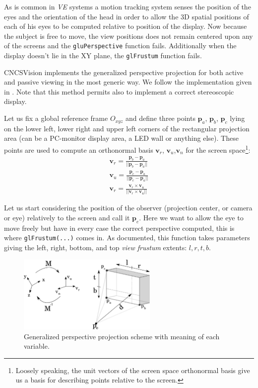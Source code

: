 \documentclass[acmtocl,acmnow]{acmtrans2m}
\begin{document}
As is common in \emph{VE} systems a motion tracking system senses the position
of the eyes and the orientation of the head in 
order to allow the 3D spatial positions of each of his eyes to be computed
relative to position of the display. Now because the subject is free to move,
the view positions does not remain centered upon any 
of the screens and the \verb=gluPerspective= function fails. Additionally when
the display doesn't lie in the XY plane, the \verb=glFrustum= function fails.

CNCSVision implements the generalized perspective projection for both active and
passive viewing in the most generic way. We follow the implementation given in
\cite{kooima}. Note that this method permits
also to implement a correct stereoscopic display.

Let us fix a global reference frame $O_{xyz}$ and define three points
$\mathbf{p}_{a}$, $\mathbf{p}_b$, $\mathbf{p}_c$ lying on the lower left, lower
right and upper left corners of the rectangular projection area 
(can be a PC-monitor display area, a LED wall or anything else). These points
are used to compute an orthonormal basis $\mathbf{v}_r$,
$\mathbf{v}_u$,$\mathbf{v}_n$ for the screen space\footnote{Loosely speaking,
the unit vectors of the screen space orthonormal basis give us a basis for
describing points relative to the screen.}:
\begin{eqnarray}
 \mathbf{v}_r = \frac{\mathbf{p}_b-\mathbf{p}_a}{||\mathbf{p}_b-\mathbf{p}_a||}
\nonumber \\
 \mathbf{v}_u = \frac{\mathbf{p}_c-\mathbf{p}_a}{||\mathbf{p}_c-\mathbf{p}_a||}
\nonumber \\
 \mathbf{v}_r = \frac{\mathbf{v}_r \times \mathbf{v}_u}{||\mathbf{v}_r \times
\mathbf{v}_u||}
\end{eqnarray}


Let us start considering the position of the observer (projection center, or
camera or eye) relatively to the screen and call it $\mathbf{p}_e$. 
Here we want to allow the eye to move freely but have in every case the correct
perspective computed, this is where \verb=glFrustum(...)= comes in. As
documented, this function takes parameters giving the left,
right, bottom, and top \emph{view frustum} extents: $l,r,t,b$.

 \begin{figure}[ht]
 \centering
 \includegraphics[width=0.6\textwidth]{genperspectiveprojection2.eps}
 \caption{Generalized perspective projection scheme with meaning of each
variable.}
 \label{fig:perspectiveprojection}
\end{figure}
\end{document}
